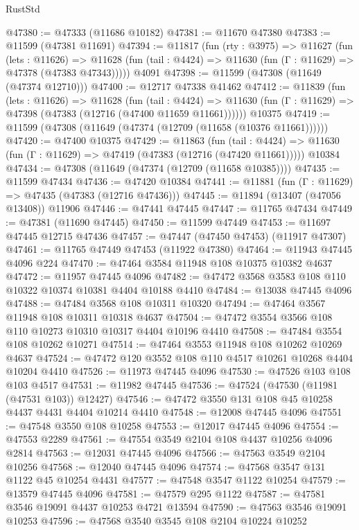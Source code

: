 \begin{lexlean}{RustStd}
\begin{coremodule}
@47380 := @47333 (@11686 @10182)
@47381 := @11670 @47380
@47383 := @11599 (@47381 @11691)
@47394 := @11817
    (fun (rty : @3975) =>
    @11627
      (fun (lets : @11626) =>
      @11628 (fun (tail : @4424) => @11630 (fun (Γ : @11629) => @47378 (@47383 @47343)))))
    @4091
@47398 := @11599 (@47308 (@11649 (@47374 @12710)))
@47400 := @12717 @47338 @41462
@47412 := @11839
    (fun (lets : @11626) =>
    @11628
      (fun (tail : @4424) =>
      @11630 (fun (Γ : @11629) => @47398 (@47383 (@12716 (@47400 @11659 @11661))))))
    @10375
@47419 := @11599 (@47308 (@11649 (@47374 (@12709 (@11658 (@10376 @11661))))))
@47420 := @47400 @10375
@47429 := @11863
    (fun (tail : @4424) => @11630 (fun (Γ : @11629) => @47419 (@47383 (@12716 (@47420 @11661)))))
    @10384
@47434 := @47308 (@11649 (@47374 (@12709 (@11658 @10385))))
@47435 := @11599 @47434
@47436 := @47420 @10384
@47441 := @11881 (fun (Γ : @11629) => @47435 (@47383 (@12716 @47436)))
@47445 := @11894 (@13407 (@47056 @13408)) @11906
@47446 := @47441 @47445
@47447 := @11765 @47434
@47449 := @47381 (@11690 @47445)
@47450 := @11599 @47449
@47453 := @11697 @47445 @12715 @47436
@47457 := @47447 (@47450 @47453) (@11917 @47307)
@47461 := @11765 @47449 @47453 (@11922 @47380)
@47464 := @11943 @47445 @4096 @224
@47470 := @47464 @3584 @11948 @108 @10375 @10382 @4637
@47472 := @11957 @47445 @4096
@47482 := @47472 @3568 @3583 @108 @110 @10322 @10374 @10381 @4404 @10188 @4410
@47484 := @13038 @47445 @4096
@47488 := @47484 @3568 @108 @10311 @10320
@47494 := @47464 @3567 @11948 @108 @10311 @10318 @4637
@47504 := @47472 @3554 @3566 @108 @110 @10273 @10310 @10317 @4404 @10196 @4410
@47508 := @47484 @3554 @108 @10262 @10271
@47514 := @47464 @3553 @11948 @108 @10262 @10269 @4637
@47524 := @47472 @120 @3552 @108 @110 @4517 @10261 @10268 @4404 @10204 @4410
@47526 := @11973 @47445 @4096
@47530 := @47526 @103 @108 @103 @4517
@47531 := @11982 @47445
@47536 := @47524 (@47530 (@11981 (@47531 @103)) @12427)
@47546 := @47472 @3550 @131 @108 @45 @10258 @4437 @4431 @4404 @10214 @4410
@47548 := @12008 @47445 @4096
@47551 := @47548 @3550 @108 @10258
@47553 := @12017 @47445 @4096
@47554 := @47553 @2289
@47561 := @47554 @3549 @2104 @108 @4437 @10256 @4096 @2814
@47563 := @12031 @47445 @4096
@47566 := @47563 @3549 @2104 @10256
@47568 := @12040 @47445 @4096
@47574 := @47568 @3547 @131 @1122 @45 @10254 @4431
@47577 := @47548 @3547 @1122 @10254
@47579 := @13579 @47445 @4096
@47581 := @47579 @295 @1122
@47587 := @47581 @3546 @19091 @4437 @10253 @4721 @13594
@47590 := @47563 @3546 @19091 @10253
@47596 := @47568 @3540 @3545 @108 @2104 @10224 @10252

\end{coremodule}
\end{lexlean}
